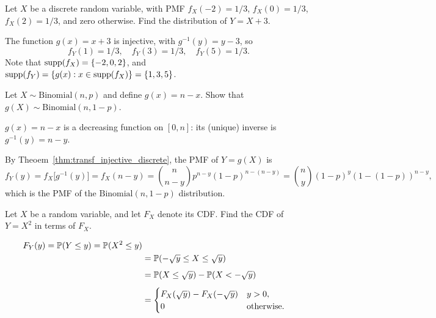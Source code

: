 \begin{exercise}
\begin{questions}
\question
Let $X$ be a discrete random variable, with PMF $f_X(-2)=1/3$, $f_X(0)=1/3$, $f_X(2)=1/3$, and zero otherwise. Find the distribution of $Y=X+3$.
\begin{answer}
The function $g(x)=x+3$ is injective, with $g^{-1}(y) = y-3$, so
\[
f_Y(1)=1/3,\quad f_Y(3)=1/3,\quad f_Y(5)=1/3.
\]
Note that $\text{supp}(f_X)=\{-2,0,2\}$, and $\text{supp}(f_Y) = \{g(x):x\in\text{supp}(f_X)\} = \{1,3,5\}$.
\end{answer}
\question
Let $X\sim\text{Binomial}(n,p)$ and define $g(x)=n-x$. Show that $g(X)\sim\text{Binomial}(n,1-p)$.
\begin{answer}
$g(x)=n-x$ is a decreasing function on $[0,n]$: its (unique) inverse is $g^{-1}(y)=n-y$. 
\par
By Theoem~\ref{thm:transf_injective_discrete}, the PMF of $Y=g(X)$ is
\[
f_Y(y) = f_X\big[g^{-1}(y)\big] = f_X(n-y) 
	= \binom{n}{n-y} p^{n-y}(1-p)^{n-(n-y)} = \binom{n}{y}(1-p)^y (1-(1-p))^{n-y},
\]
which is the PMF of the $\text{Binomial}(n,1-p)$ distribution.
\end{answer}
\question
Let $X$ be a random variable, and let $F_X$ denote its CDF. Find the CDF of $Y=X^2$ in terms of $F_X$.
\begin{answer}
\begin{align*}
F_Y(y) = \mathbb{P}(Y\leq y) = \mathbb{P}(X^2\leq y) \\
	& = \mathbb{P}(-\sqrt{y}\leq X\leq \sqrt{y}) \\[1ex]
	& = \mathbb{P}(X\leq \sqrt{y}) - \mathbb{P}(X < -\sqrt{y}) \\[1ex]
	& = \begin{cases}
		F_X(\sqrt{y}) - F_X(-\sqrt{y})	& y > 0, \\
		0								& \text{otherwise.}
	\end{cases}	
\end{align*}
\end{answer}


\end{questions}
\end{exercise}
